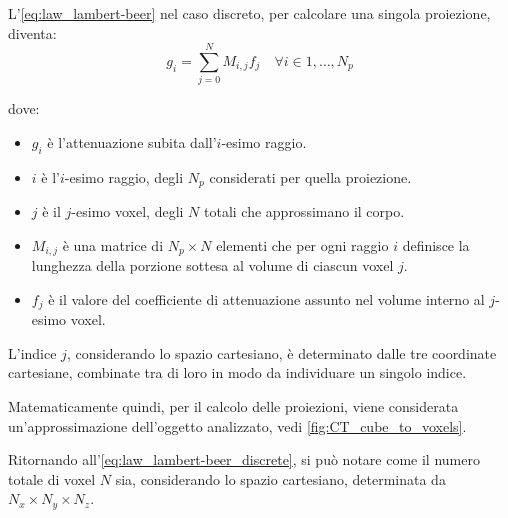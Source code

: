 \documentclass[12pt,a4paper]{report}
\begin{document}
L'\autoref{eq:law_lambert-beer} nel caso discreto, per calcolare una singola proiezione, diventa:
\begin{equation} \label{eq:law_lambert-beer_discrete}
  g_i = \sum_{j=0}^N M_{i, j} f_j \quad \forall i \in 1, \dots, N_p
\end{equation}

dove:
\begin{itemize}
  \item \(g_i\) è l'attenuazione subita dall'\(i\)-esimo raggio.
  \item \(i\) è l'\(i\)-esimo raggio, degli \(N_p\) considerati per quella proiezione.
  \item \(j\) è il \(j\)-esimo voxel, degli \(N\) totali che approssimano il corpo.
  \item \(M_{i,j}\) è una matrice di \(N_p \times N\) elementi che per ogni raggio \(i\) definisce la lunghezza della porzione
        sottesa al volume di ciascun voxel \(j\).
  \item \(f_j\) è il valore del coefficiente di attenuazione assunto nel volume interno al \(j\)-esimo voxel.
\end{itemize}

L'indice \(j\), considerando lo spazio cartesiano, è determinato dalle tre coordinate cartesiane, combinate tra di loro in modo da
individuare un singolo indice.

Matematicamente quindi, per il calcolo delle proiezioni, viene considerata un'approssimazione dell'oggetto analizzato, vedi
\autoref{fig:CT_cube_to_voxels}.

Ritornando all'\autoref{eq:law_lambert-beer_discrete}, si può notare come il numero totale di voxel \(N\) sia, considerando lo
spazio cartesiano, determinata da \(N_x \times N_y \times N_z\).
\end{document}
